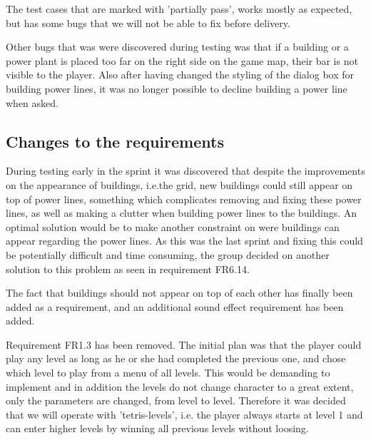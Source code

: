 	The test cases that are marked with 'partially pass', works mostly as expected, but has some bugs 
	that we will not be able to fix before delivery.

	Other bugs that was were discovered during testing was that if a building or a power plant is placed 
	too far on the right side on the game map, their bar is not visible to the player. Also after having 
	changed the styling of the dialog box for building power lines, it was no longer possible to decline 
	building a power line when asked.

\subsection{Changes to the requirements}

	During testing early in the sprint it was discovered that despite the improvements on the appearance of buildings, i.e.the grid, new buildings could still appear on top of power lines, something which complicates removing and fixing these power lines, as well as making a clutter when building power lines to the buildings. An optimal solution would be to make another constraint on were buildings can appear regarding the power lines. As this was the last sprint and fixing this could be potentially difficult and time consuming, the group decided on another solution to this problem as seen  in requirement FR6.14.

	The fact that buildings should not appear on top of each other has finally been added as a requirement, and an additional sound effect requirement has been added.

	Requirement FR1.3 has been removed. The initial plan was that the player could play any level as long as he or she had completed the previous one, and chose which level to play from a menu of all levels. This would be demanding to implement and in addition the levels do not change character to a great extent, only the parameters are changed, from level to level. Therefore it was decided that we will operate with 'tetris-levels', i.e. the player always starts at level 1 and can enter higher levels by winning all previous levels without loosing. 

